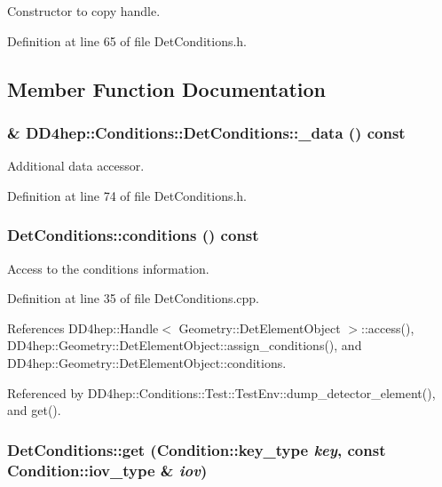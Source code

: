 Constructor to copy handle. 

Definition at line 65 of file DetConditions.h.

\subsection{Member Function Documentation}
\hypertarget{class_d_d4hep_1_1_conditions_1_1_det_conditions_a07ac5ff6cc7113eed2568952951bc8df}{
\subsubsection[{\_\-data}]{\& DD4hep::Conditions::DetConditions::\_\-data () const}}
\label{class_d_d4hep_1_1_conditions_1_1_det_conditions_a07ac5ff6cc7113eed2568952951bc8df}


Additional data accessor. 

Definition at line 74 of file DetConditions.h.\hypertarget{class_d_d4hep_1_1_conditions_1_1_det_conditions_a647bd874d691721d29a739b912e8c02e}{
\subsubsection[{conditions}]{ DetConditions::conditions () const}}
\label{class_d_d4hep_1_1_conditions_1_1_det_conditions_a647bd874d691721d29a739b912e8c02e}


Access to the conditions information. 

Definition at line 35 of file DetConditions.cpp.

References DD4hep::Handle$<$ Geometry::DetElementObject $>$::access(), DD4hep::Geometry::DetElementObject::assign\_\-conditions(), and DD4hep::Geometry::DetElementObject::conditions.

Referenced by DD4hep::Conditions::Test::TestEnv::dump\_\-detector\_\-element(), and get().\hypertarget{class_d_d4hep_1_1_conditions_1_1_det_conditions_a27faa309035740b80ff2053fff6f30ba}{
\subsubsection[{get}]{ DetConditions::get ({\bf Condition::key\_\-type} {\em key}, \/  const {\bf Condition::iov\_\-type} \& {\em iov})}}
\label{class_d_d4hep_1_1_conditions_1_1_det_conditions_a27faa309035740b80ff2053fff6f30ba}


